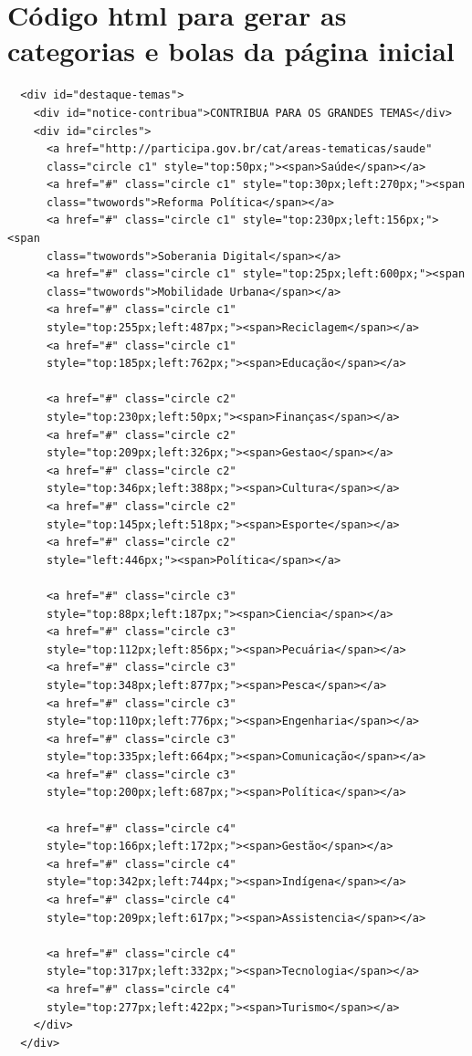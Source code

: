 \newpage
\section{Código html para gerar as categorias e bolas da página
inicial}
\label{Att:CategoriasBolas}

{\tiny
  \begin{verbatim}
  <div id="destaque-temas">
    <div id="notice-contribua">CONTRIBUA PARA OS GRANDES TEMAS</div>
    <div id="circles">
      <a href="http://participa.gov.br/cat/areas-tematicas/saude"
      class="circle c1" style="top:50px;"><span>Saúde</span></a>
      <a href="#" class="circle c1" style="top:30px;left:270px;"><span
      class="twowords">Reforma Política</span></a>
      <a href="#" class="circle c1" style="top:230px;left:156px;"><span
      class="twowords">Soberania Digital</span></a>
      <a href="#" class="circle c1" style="top:25px;left:600px;"><span
      class="twowords">Mobilidade Urbana</span></a>
      <a href="#" class="circle c1"
      style="top:255px;left:487px;"><span>Reciclagem</span></a>
      <a href="#" class="circle c1"
      style="top:185px;left:762px;"><span>Educação</span></a>
      
      <a href="#" class="circle c2"
      style="top:230px;left:50px;"><span>Finanças</span></a>
      <a href="#" class="circle c2"
      style="top:209px;left:326px;"><span>Gestao</span></a>
      <a href="#" class="circle c2"
      style="top:346px;left:388px;"><span>Cultura</span></a>
      <a href="#" class="circle c2"
      style="top:145px;left:518px;"><span>Esporte</span></a>
      <a href="#" class="circle c2"
      style="left:446px;"><span>Política</span></a>
      
      <a href="#" class="circle c3"
      style="top:88px;left:187px;"><span>Ciencia</span></a>
      <a href="#" class="circle c3"
      style="top:112px;left:856px;"><span>Pecuária</span></a>
      <a href="#" class="circle c3"
      style="top:348px;left:877px;"><span>Pesca</span></a>
      <a href="#" class="circle c3"
      style="top:110px;left:776px;"><span>Engenharia</span></a>
      <a href="#" class="circle c3"
      style="top:335px;left:664px;"><span>Comunicação</span></a>
      <a href="#" class="circle c3"
      style="top:200px;left:687px;"><span>Política</span></a>
      
      <a href="#" class="circle c4"
      style="top:166px;left:172px;"><span>Gestão</span></a>
      <a href="#" class="circle c4"
      style="top:342px;left:744px;"><span>Indígena</span></a>
      <a href="#" class="circle c4"
      style="top:209px;left:617px;"><span>Assistencia</span></a>
      
      <a href="#" class="circle c4"
      style="top:317px;left:332px;"><span>Tecnologia</span></a>
      <a href="#" class="circle c4"
      style="top:277px;left:422px;"><span>Turismo</span></a>
    </div>
  </div>
  \end{verbatim}
}

